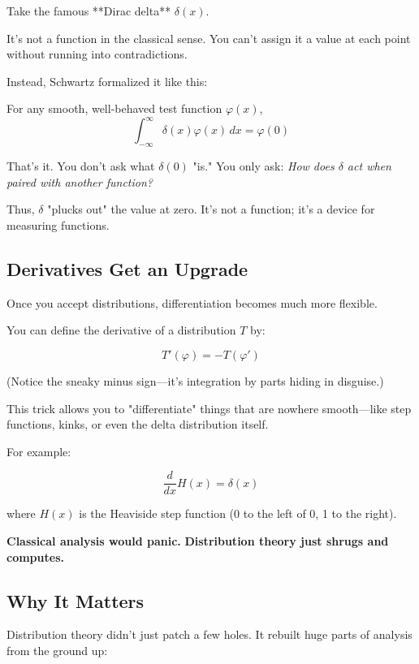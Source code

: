 Take the famous **Dirac delta** \( \delta(x) \).

It’s not a function in the classical sense.  
You can’t assign it a value at each point without running into contradictions.

Instead, Schwartz formalized it like this:

For any smooth, well-behaved test function \( \varphi(x) \),
\[
\int_{-\infty}^{\infty} \delta(x) \varphi(x) \, dx = \varphi(0)
\]

That's it.  
You don't ask what \( \delta(0) \) "is."  
You only ask: \textit{How does \( \delta \) act when paired with another function?}

\medskip

Thus, \( \delta \) "plucks out" the value at zero.  
It’s not a function; it’s a device for measuring functions.

\subsection*{Derivatives Get an Upgrade}

Once you accept distributions, differentiation becomes much more flexible.

You can define the derivative of a distribution \( T \) by:

\[
T'(\varphi) = -T(\varphi')
\]

(Notice the sneaky minus sign—it’s integration by parts hiding in disguise.)

This trick allows you to "differentiate" things that are nowhere smooth—like step functions, kinks, or even the delta distribution itself.

\medskip

For example:

\[
\frac{d}{dx} H(x) = \delta(x)
\]

where \( H(x) \) is the Heaviside step function (0 to the left of 0, 1 to the right).

\smallskip

\textbf{Classical analysis would panic.}  
\textbf{Distribution theory just shrugs and computes.}

\subsection*{Why It Matters}

Distribution theory didn't just patch a few holes.  
It rebuilt huge parts of analysis from the ground up:

